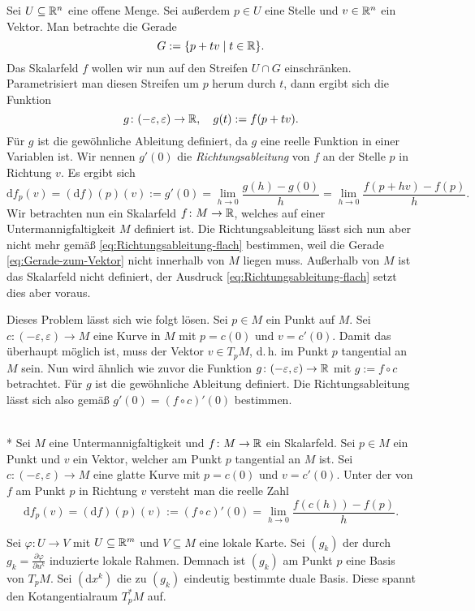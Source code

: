 Sei $U\subseteq\mathbb R^n$ eine offene Menge. Sei außerdem $p\in U$ 
eine Stelle und $v\in\mathbb R^n$ ein Vektor. Man betrachte die Gerade
\begin{equation}\label{eq:Gerade-zum-Vektor}
G := \{p+tv\mid t\in\mathbb R\}.
\end{equation}
Das Skalarfeld $f$ wollen wir nun auf den Streifen $U\cap G$
einschränken. Parametrisiert man diesen Streifen um $p$ herum durch
$t$, dann ergibt sich die Funktion%
\begin{equation}
g\colon (-\varepsilon,\varepsilon)\to\mathbb R,\quad g(t):=f(p+tv).
\end{equation}
Für $g$ ist die gewöhnliche Ableitung definiert, da $g$
eine reelle Funktion in einer Variablen ist. Wir nennen $g'(0)$ die
\emph{Richtungsableitung} von $f$ an der Stelle $p$ in Richtung $v$.
Es ergibt sich%
\begin{equation}\label{eq:Richtungsableitung-flach}
\mathrm df_p(v) = (\mathrm df)(p)(v) := g'(0)
= \lim_{h\to 0}\frac{g(h)-g(0)}{h}
= \lim_{h\to 0}\frac{f(p+hv)-f(p)}{h}.
\end{equation}
Wir betrachten nun ein Skalarfeld $f\colon M\to\mathbb R$, welches
auf einer Untermannigfaltigkeit $M$ definiert ist.
Die Richtungsableitung lässt sich nun aber nicht mehr gemäß
\eqref{eq:Richtungsableitung-flach} bestimmen, weil die Gerade
\eqref{eq:Gerade-zum-Vektor} nicht innerhalb von $M$ liegen muss.
Außerhalb von $M$ ist das Skalarfeld nicht definiert, der Ausdruck
\eqref{eq:Richtungsableitung-flach} setzt dies aber voraus.

Dieses Problem lässt sich wie folgt lösen. Sei $p\in M$ ein Punkt
auf $M$. Sei $c\colon (-\varepsilon,\varepsilon)\to M$ eine Kurve
in $M$ mit $p=c(0)$ und $v=c'(0)$. Damit das überhaupt möglich ist, muss
der Vektor $v\in T_p M$, d.\,h. im Punkt $p$ tangential an $M$ sein.
Nun wird ähnlich wie zuvor die Funktion
$g\colon (-\varepsilon,\varepsilon)\to\mathbb R$ mit $g:=f\circ c$ betrachtet.
Für $g$ ist die gewöhnliche Ableitung definiert. Die Richtungsableitung
lässt sich also gemäß $g'(0)=(f\circ c)'(0)$ bestimmen.

\begin{definition}[Richtungsableitung]%
\mbox{}\\*
Sei $M$ eine Untermannigfaltigkeit und $f\colon M\to\mathbb R$ ein Skalarfeld.
Sei $p\in M$ ein Punkt und $v$ ein Vektor, welcher am Punkt $p$
tangential an $M$ ist. Sei $c\colon (-\varepsilon,\varepsilon)\to M$
eine glatte Kurve mit $p=c(0)$ und $v=c'(0)$. Unter der
 von $f$ am Punkt $p$ in Richtung $v$
versteht man die reelle Zahl
\begin{equation}
\mathrm df_p(v) = (\mathrm df)(p)(v) := (f\circ c)'(0)
= \lim_{h\to 0}\frac{f(c(h))-f(p)}{h}.
\end{equation}
\end{definition}
Sei $\varphi\colon U\to V$ mit $U\subseteq\mathbb R^m$ und $V\subseteq M$
eine lokale Karte. Sei $(g_k)$ der durch
$g_k=\frac{\partial\varphi}{\partial u^k}$ induzierte lokale
Rahmen. Demnach ist $(g_k)$ am Punkt $p$ eine
Basis von $T_p M$. Sei $(\mathrm dx^k)$ die zu $(g_k)$ eindeutig
bestimmte duale Basis. Diese spannt den Kotangentialraum $T_p^* M$ auf.


